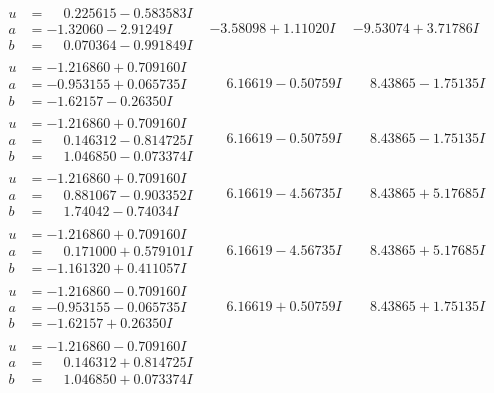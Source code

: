 \documentclass[1p]{elsarticle_modified}
\theoremstyle{definition}
\begin{document}
$$\begin{array}{c|c|c}
\begin{aligned}
u &= \phantom{-}0.225615 - 0.583583 I \\
a &= -1.32060 - 2.91249 I \\
b &= \phantom{-}0.070364 - 0.991849 I\end{aligned}
 & -3.58098 + 1.11020 I & -9.53074 + 3.71786 I \\ \hline\begin{aligned}
u &= -1.216860 + 0.709160 I \\
a &= -0.953155 + 0.065735 I \\
b &= -1.62157 - 0.26350 I\end{aligned}
 & \phantom{-}6.16619 - 0.50759 I & \phantom{-}8.43865 - 1.75135 I \\ \hline\begin{aligned}
u &= -1.216860 + 0.709160 I \\
a &= \phantom{-}0.146312 - 0.814725 I \\
b &= \phantom{-}1.046850 - 0.073374 I\end{aligned}
 & \phantom{-}6.16619 - 0.50759 I & \phantom{-}8.43865 - 1.75135 I \\ \hline\begin{aligned}
u &= -1.216860 + 0.709160 I \\
a &= \phantom{-}0.881067 - 0.903352 I \\
b &= \phantom{-}1.74042 - 0.74034 I\end{aligned}
 & \phantom{-}6.16619 - 4.56735 I & \phantom{-}8.43865 + 5.17685 I \\ \hline\begin{aligned}
u &= -1.216860 + 0.709160 I \\
a &= \phantom{-}0.171000 + 0.579101 I \\
b &= -1.161320 + 0.411057 I\end{aligned}
 & \phantom{-}6.16619 - 4.56735 I & \phantom{-}8.43865 + 5.17685 I \\ \hline\begin{aligned}
u &= -1.216860 - 0.709160 I \\
a &= -0.953155 - 0.065735 I \\
b &= -1.62157 + 0.26350 I\end{aligned}
 & \phantom{-}6.16619 + 0.50759 I & \phantom{-}8.43865 + 1.75135 I \\ \hline\begin{aligned}
u &= -1.216860 - 0.709160 I \\
a &= \phantom{-}0.146312 + 0.814725 I \\
b &= \phantom{-}1.046850 + 0.073374 I\end{aligned}

\end{array}$$
\end{document}
